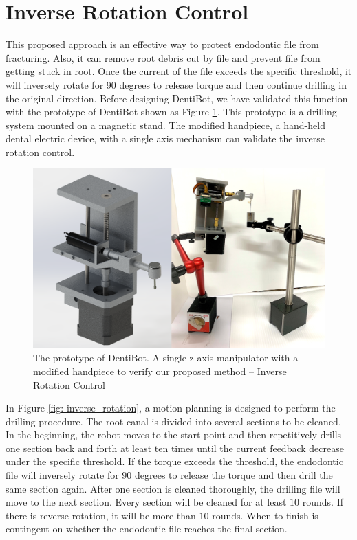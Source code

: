 \section{Inverse Rotation Control}
\label{sec:Inverse Rotation Control}
\hspace*{6mm}This proposed approach is an effective way to protect endodontic file from fracturing. Also, it can remove root debris cut by file and prevent file from getting stuck in root. Once the current of the file exceeds the specific threshold, it will inversely rotate for 90 degrees to release torque and then continue drilling in the original direction. Before designing DentiBot, we have validated this function with the prototype of DentiBot shown as Figure \ref{fig: prototype}. This prototype is a drilling system mounted on a magnetic stand. The modified handpiece, a hand-held dental electric device, with a single axis mechanism can validate the inverse rotation control. 
\begin{figure}[htbp]
\begin{center}
\includegraphics[width=0.9\linewidth]{Images/Prototype.png}
\caption{The prototype of DentiBot. A single z-axis manipulator with a modified handpiece to verify our proposed method -- Inverse Rotation Control}
\label{fig: prototype}
\end{center}
\end{figure}	
\vspace{-5mm}
\par
In Figure \ref{fig: inverse_rotation}, a motion planning is designed to perform the drilling procedure. The root canal is divided into several sections to be cleaned. In the beginning, the robot moves to the start point and then repetitively drills one section back and forth at least ten times until the current feedback decrease under the specific threshold. If the torque exceeds the threshold, the endodontic file will inversely rotate for $90$ degrees to release the torque and then drill the same section again. After one section is cleaned thoroughly, the drilling file will move to the next section. Every section will be cleaned for at least $10$ rounds. If there is reverse rotation, it will be more than $10$ rounds. When to finish is contingent on whether the endodontic file reaches the final section.
